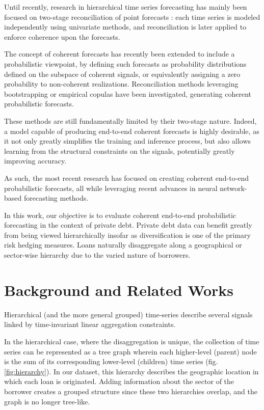 \documentclass[letterpaper]{article}
\begin{document}
Until recently, research in hierarchical time series forecasting has mainly been focused on two-stage reconciliation of point forecasts : each time series is modeled independently using univariate methods, and reconciliation is later applied to enforce coherence upon the forecasts.

The concept of coherent forecasts has recently been extended to include a probabilistic viewpoint, by defining such forecasts as probability distributions defined on the subspace of coherent signals, or equivalently assigning a zero probability to non-coherent realizations. Reconciliation methods leveraging bootstrapping \cite{Thesis} or empirical copulas \cite{PERMBU} have been investigated, generating coherent probabilistic forecasts.

These methods are still fundamentally limited by their two-stage nature. Indeed, a model capable of producing end-to-end coherent forecasts is highly desirable, as it not only greatly simplifies the training and inference process, but also allows learning from the structural constraints on the signals, potentially greatly improving accuracy. 

As such, the most recent research has focused on creating coherent end-to-end probabilistic forecasts, all while leveraging recent advances in neural network-based forecasting methods. 

In this work, our objective is to evaluate coherent end-to-end probabilistic forecasting in the context of private debt. Private debt data can benefit greatly from being viewed hierarchically insofar as diversification is one of the primary risk hedging measures. Loans naturally disaggregate along a geographical or sector-wise hierarchy due to the varied nature of borrowers. 
 


\section{Background and Related Works}

Hierarchical (and the more general grouped) time-series describe several signals linked by time-invariant linear aggregation constraints.

In the hierarchical case, where the disaggregation is unique, the collection of time series can be represented as a tree graph wherein each higher-level (parent) node is the sum of its corresponding lower-level (children) time series (fig. \ref{fig:hierarchy}).  In our dataset, this hierarchy describes the geographic location in which each loan is originated. Adding information about the sector of the borrower creates a grouped structure since these two hierarchies overlap, and the graph is no longer tree-like. 
\end{document}
